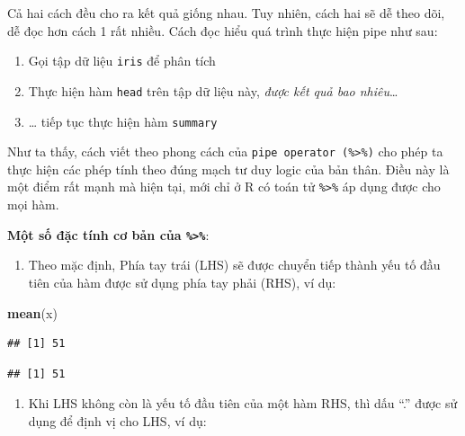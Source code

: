 \documentclass[]{krantz}
\makeatletter
\newenvironment{Shaded}{\begin{snugshade}}{\end{snugshade}}
\newcommand{\CommentTok}[1]{\textcolor[rgb]{0.37,0.37,0.37}{\textit{#1}}}
\newcommand{\KeywordTok}[1]{\textcolor[rgb]{0.27,0.27,0.27}{\textbf{#1}}}
\newcommand{\NormalTok}[1]{#1}
\newcommand{\OperatorTok}[1]{\textcolor[rgb]{0.43,0.43,0.43}{\textbf{#1}}}
\newcommand{\StringTok}[1]{\textcolor[rgb]{0.5,0.5,0.5}{#1}}
\providecommand{\tightlist}{%
  \setlength{\itemsep}{0pt}\setlength{\parskip}{0pt}}
\newenvironment{kframe}{%
\medskip{}
\setlength{\fboxsep}{.8em}
 \def\at@end@of@kframe{}%
 \ifinner\ifhmode%
  \def\at@end@of@kframe{\end{minipage}}%
  \begin{minipage}{\columnwidth}%
 \fi\fi%
 \def\FrameCommand##1{\hskip\@totalleftmargin \hskip-\fboxsep
 \colorbox{shadecolor}{##1}\hskip-\fboxsep
     \hskip-\linewidth \hskip-\@totalleftmargin \hskip\columnwidth}%
 \MakeFramed {\advance\hsize-\width
   \@totalleftmargin\z@ \linewidth\hsize
   \@setminipage}}%
 {\par\unskip\endMakeFramed%
 \at@end@of@kframe}
\renewenvironment{Shaded}{\begin{kframe}}{\end{kframe}}
\renewenvironment{Shaded}{\begin{snugshade}}{\end{snugshade}}
\renewcommand{\CommentTok}[1]{\textcolor[rgb]{0.56,0.35,0.01}{\textit{#1}}}
\renewcommand{\KeywordTok}[1]{\textcolor[rgb]{0.13,0.29,0.53}{\textbf{#1}}}
\renewcommand{\NormalTok}[1]{#1}
\renewcommand{\OperatorTok}[1]{\textcolor[rgb]{0.81,0.36,0.00}{\textbf{#1}}}
\renewcommand{\StringTok}[1]{\textcolor[rgb]{0.31,0.60,0.02}{#1}}
\theoremstyle{definition}
\theoremstyle{definition}
\theoremstyle{definition}
\theoremstyle{remark}
\makeatother
\begin{document}
Cả hai cách đều cho ra kết quả giống nhau. Tuy nhiên, cách hai sẽ dễ
theo dõi, dễ đọc hơn cách 1 rất nhiều. Cách đọc hiểu quá trình thực hiện
pipe như sau:

\begin{enumerate}
\def\labelenumi{\arabic{enumi}.}
\tightlist
\item
  Gọi tập dữ liệu \texttt{iris} để phân tích
\item
  Thực hiện hàm \texttt{head} trên tập dữ liệu này, \emph{được kết quả
  bao nhiêu}\ldots{}
\item
  \ldots{} tiếp tục thực hiện hàm \texttt{summary}
\end{enumerate}

Như ta thấy, cách viết theo phong cách của
\texttt{pipe\ operator\ (\%\textgreater{}\%)} cho phép ta thực hiện các
phép tính theo đúng mạch tư duy logic của bản thân. Điều này là một điểm
rất mạnh mà hiện tại, mới chỉ ở R có toán tử \texttt{\%\textgreater{}\%}
áp dụng được cho mọi hàm.

\textbf{Một số đặc tính cơ bản của \texttt{\%\textgreater{}\%}}:

\begin{enumerate}
\def\labelenumi{\arabic{enumi}.}
\tightlist
\item
  Theo mặc định, Phía tay trái (LHS) sẽ được chuyển tiếp thành yếu tố
  đầu tiên của hàm được sử dụng phía tay phải (RHS), ví dụ:
\end{enumerate}

\begin{Shaded}
\begin{Highlighting}[]
\KeywordTok{mean}\NormalTok{(x) }
\end{Highlighting}
\end{Shaded}

\begin{verbatim}
## [1] 51
\end{verbatim}

\begin{Shaded}
\end{Shaded}

\begin{verbatim}
## [1] 51
\end{verbatim}

\begin{enumerate}
\def\labelenumi{\arabic{enumi}.}
\setcounter{enumi}{1}
\tightlist
\item
  Khi LHS không còn là yếu tố đầu tiên của một hàm RHS, thì dấu ``.''
  được sử dụng để định vị cho LHS, ví dụ:
\end{enumerate}
\end{document}
